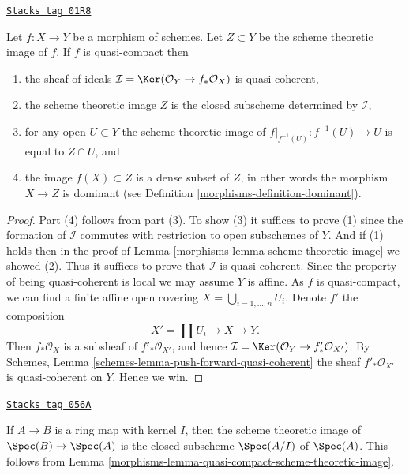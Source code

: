\begin{lemma}
\label{morphisms-lemma-quasi-compact-scheme-theoretic-image}
\href{https://stacks.math.columbia.edu/tag/01R8}{\texttt{Stacks tag 01R8}}

Let $f : X \to Y$ be a morphism of schemes.
Let $Z \subset Y$ be the scheme theoretic image of $f$.
If $f$ is quasi-compact then
\begin{enumerate}
\item the sheaf of ideals
$\mathcal{I} = \Ker(\mathcal{O}_Y \to f_*\mathcal{O}_X)$
is quasi-coherent,
\item the scheme theoretic image $Z$ is the closed subscheme
determined by $\mathcal{I}$,
\item for any open $U \subset Y$ the scheme theoretic image of
$f|_{f^{-1}(U)} : f^{-1}(U) \to U$ is equal to $Z \cap U$, and
\item the image $f(X) \subset Z$ is a dense subset of $Z$, in other
words the morphism $X \to Z$ is dominant
(see Definition \ref{morphisms-definition-dominant}).
\end{enumerate}
\end{lemma}

\begin{proof}

Part (4) follows from part (3). To show (3) it suffices
to prove (1) since the formation of $\mathcal{I}$ commutes with restriction to
open subschemes of $Y$. And if (1) holds then in the proof of
Lemma \ref{morphisms-lemma-scheme-theoretic-image}
we showed (2). Thus it suffices to prove that $\mathcal{I}$ is quasi-coherent.
Since the property of being quasi-coherent is
local we may assume $Y$ is affine. As $f$ is quasi-compact,
we can find a finite affine open covering
$X = \bigcup_{i = 1, \ldots, n} U_i$. Denote $f'$ the composition
$$
X' = \coprod U_i \longrightarrow X \longrightarrow Y.
$$
Then $f_*\mathcal{O}_X$ is a subsheaf of $f'_*\mathcal{O}_{X'}$,
and hence $\mathcal{I} = \Ker(\mathcal{O}_Y \to f'_*\mathcal{O}_{X'})$.
By Schemes, Lemma \ref{schemes-lemma-push-forward-quasi-coherent}
the sheaf $f'_*\mathcal{O}_{X'}$ is quasi-coherent on $Y$. Hence we win.
\end{proof}

\begin{example}
\label{morphisms-example-scheme-theoretic-image}
\href{https://stacks.math.columbia.edu/tag/056A}{\texttt{Stacks tag 056A}}

If $A \to B$ is a ring map with kernel $I$, then the scheme theoretic image
of $\Spec(B) \to \Spec(A)$ is the closed subscheme
$\Spec(A/I)$ of $\Spec(A)$. This follows from
Lemma \ref{morphisms-lemma-quasi-compact-scheme-theoretic-image}.
\end{example}


